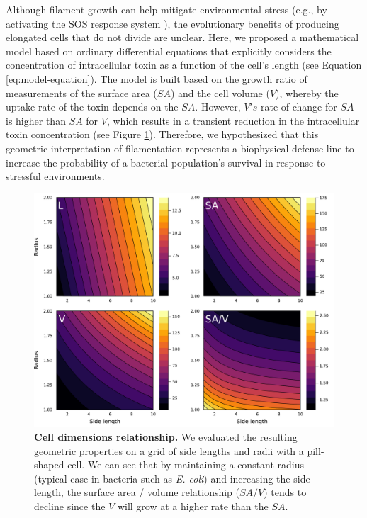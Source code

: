 \documentclass[a4paper, nobind]{templates/ociamthesis}
\begin{document}
Although filament growth can help mitigate environmental stress (e.g., by activating the SOS response system \autocite{justiceMorphologicalPlasticityBacterial2008}), the evolutionary benefits of producing elongated cells that do not divide are unclear. Here, we proposed a mathematical model based on ordinary differential equations that explicitly considers the concentration of intracellular toxin as a function of the cell's length (see Equation \eqref{eq:model-equation}). The model is built based on the growth ratio of measurements of the surface area (\(SA\)) and the cell volume (\(V\)), whereby the uptake rate of the toxin depends on the \(SA\). However, \(V's\) rate of change for \(SA\) is higher than \(SA\) for \(V\), which results in a transient reduction in the intracellular toxin concentration (see Figure \ref{fig:cell-dimensions-relationship}). Therefore, we hypothesized that this geometric interpretation of filamentation represents a biophysical defense line to increase the probability of a bacterial population's survival in response to stressful environments.





\begin{figure}[H]
\includegraphics[width=1\linewidth]{downloadFigs4latex__main/cell-dimensions-relationship} \caption[Cell dimensions relationship.]{\textbf{Cell dimensions relationship.} We evaluated the resulting geometric properties on a grid of side lengths and radii with a pill-shaped cell. We can see that by maintaining a constant radius (typical case in bacteria such as \emph{E. coli}) and increasing the side length, the surface area / volume relationship (\(SA/V\)) tends to decline since the \(V\) will grow at a higher rate than the \(SA\).}\label{fig:cell-dimensions-relationship}
\end{figure}
\end{document}
